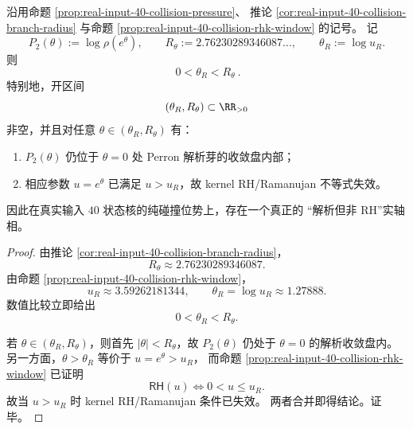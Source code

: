 \begin{theorem}\label{thm:xi-analytic-but-not-rh-phase-realinput40}
沿用命题 \ref{prop:real-input-40-collision-pressure}、
推论 \ref{cor:real-input-40-collision-branch-radius}
与命题 \ref{prop:real-input-40-collision-rhk-window} 的记号。
记
\[
P_2(\theta):=\log\rho(e^\theta),
\qquad
R_\theta:=2.76230289346087\ldots,
\qquad
\theta_R:=\log u_R.
\]
则
\[
\boxed{\ 0<\theta_R<R_\theta\ }.
\]
特别地，开区间
\[
(\theta_R,R_\theta)\subset \RR_{>0}
\]
非空，并且对任意 \(\theta\in(\theta_R,R_\theta)\) 有：
\begin{enumerate}
  \item \(P_2(\theta)\) 仍位于 \(\theta=0\) 处 Perron 解析芽的收敛盘内部；
  \item 相应参数 \(u=e^\theta\) 已满足 \(u>u_R\)，故 kernel RH/Ramanujan 不等式失效。
\end{enumerate}
因此在真实输入 \(40\) 状态核的纯碰撞位势上，存在一个真正的
“解析但非 RH”实轴相。
\end{theorem}
\begin{proof}
由推论 \ref{cor:real-input-40-collision-branch-radius}，
\[
R_\theta\approx 2.76230289346087.
\]
由命题 \ref{prop:real-input-40-collision-rhk-window}，
\[
u_R\approx 3.59262181344,
\qquad
\theta_R=\log u_R\approx 1.27888.
\]
数值比较立即给出
\[
0<\theta_R<R_\theta.
\]
\par
若 \(\theta\in(\theta_R,R_\theta)\)，则首先 \(|\theta|<R_\theta\)，故
\(P_2(\theta)\) 仍处于 \(\theta=0\) 的解析收敛盘内。
另一方面，\(\theta>\theta_R\) 等价于 \(u=e^\theta>u_R\)，
而命题 \ref{prop:real-input-40-collision-rhk-window} 已证明
\[
\textsf{RH}(u)\Longleftrightarrow 0<u\le u_R.
\]
故当 \(u>u_R\) 时 kernel RH/Ramanujan 条件已失效。
两者合并即得结论。证毕。
\end{proof}

